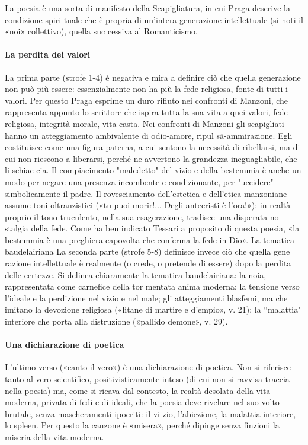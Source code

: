 \documentclass{book}
\newcounter{mar}
\begin{document}
La poesia è una sorta di manifesto della Scapigliatura, in cui Praga descrive la condizione spiri tuale che è propria di un'intera generazione intellettuale (si noti il «noi» collettivo), quella suc cessiva al Romanticismo.

\paragraph{La perdita dei valori}La prima parte (strofe 1-4) è negativa e mira a definire ciò che quella generazione non può più essere: essenzialmente non ha più la fede religiosa, fonte di tutti i valori. Per questo Praga esprime un duro rifiuto nei confronti di Manzoni, che rappresenta appunto lo scrittore che ispira tutta la sua vita a quei valori, fede religiosa, integrità morale, vita casta. Nei confronti di Manzoni gli scapigliati hanno un atteggiamento ambivalente di odio-amore, ripul sä-ammirazione. Egli costituisce come una figura paterna, a cui sentono la necessità di ribellarsi, ma di cui non riescono a liberarsi, perché ne avvertono la grandezza ineguagliabile, che li schiac cia. Il compiacimento "maledetto" del vizio e della bestemmia è anche un modo per negare una presenza incombente e condizionante, per "uccidere" simbolicamente il padre. Il rovesciamento dell'estetica e dell'etica manzoniane assume toni oltranzistici («tu puoi morir!... Degli antecristi è l'ora!»): in realtà proprio il tono truculento, nella sua esagerazione, tradisce una disperata no stalgia della fede. Come ha ben indicato Tessari a proposito di questa poesia, «la bestemmia è una preghiera capovolta che conferma la fede in Dio». La tematica baudelairiana La seconda parte (strofe 5-8) definisce invece ciò che quella gene razione intellettuale è realmente (o crede, o pretende di essere) dopo la perdita delle certezze. Si delinea chiaramente la tematica baudelairiana: la noia, rappresentata come carnefice della tor mentata anima moderna; la tensione verso l'ideale e la perdizione nel vizio e nel male; gli atteggiamenti blasfemi, ma che imitano la devozione religiosa («litane di martire e d'empio», v. 21); la “malattia" interiore che porta alla distruzione («pallido demone», v. 29).

\paragraph{Una dichiarazione di poetica} L'ultimo verso («canto il vero») è una dichiarazione di poetica. Non si riferisce tanto al vero scientifico, positivisticamente inteso (di cui non si ravvisa traccia nella poesia) ma, come si ricava dal contesto, la realtà desolata della vita moderna, privata di fedi e di ideali, che la poesia deve rivelare nel suo volto brutale, senza mascheramenti ipocriti: il vi zio, l'abiezione, la malattia interiore, lo spleen. Per questo la canzone è «misera», perché dipinge senza finzioni la miseria della vita moderna.
\end{document}
